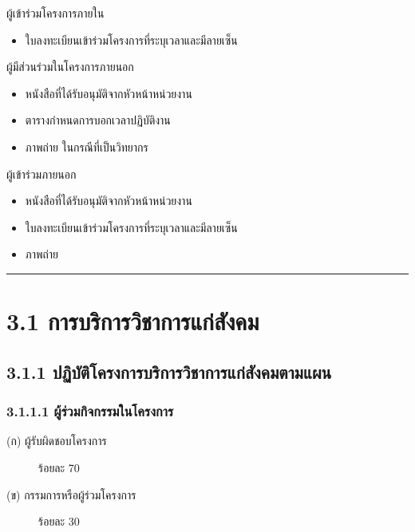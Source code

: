 \documentclass[a4paper,12pt,english]{sphinxmanual}
\begin{document}
ผู้เข้าร่วมโครงการภายใน
\begin{itemize}
\item {} 
ใบลงทะเบียนเข้าร่วมโครงการที่ระบุเวลาและมีลายเซ็น

\end{itemize}

ผู้มีส่วนร่วมในโครงการภายนอก
\begin{itemize}
\item {} 
หนังสือที่ได้รับอนุมัติจากหัวหน้าหน่วยงาน 

\item {} 
ตารางกำหนดการบอกเวลาปฏิบัติงาน

\item {} 
ภาพถ่าย ในกรณีที่เป็นวิทยากร

\end{itemize}

ผู้เข้าร่วมภายนอก
\begin{itemize}
\item {} 
หนังสือที่ได้รับอนุมัติจากหัวหน้าหน่วยงาน 

\item {} 
ใบลงทะเบียนเข้าร่วมโครงการที่ระบุเวลาและมีลายเซ็น

\item {} 
ภาพถ่าย

\end{itemize}


\bigskip\hrule\bigskip



\section{3.1 การบริการวิชาการแก่สังคม}
\label{\detokenize{3service:id5}}

\subsection{3.1.1 ปฏิบัติโครงการบริการวิชาการแก่สังคมตามแผน}
\label{\detokenize{3service:id6}}

\subsubsection{3.1.1.1 ผู้ร่วมกิจกรรมในโครงการ}
\label{\detokenize{3service:id7}}\begin{description}
\item[{(ก) ผู้รับผิดชอบโครงการ}] \leavevmode
ร้อยละ 70

\item[{(ข) กรรมการหรือผู้ร่วมโครงการ}] \leavevmode
ร้อยละ 30

\end{description}
\end{document}
